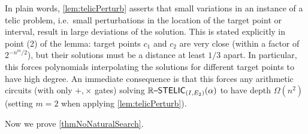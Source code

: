 \documentclass{amsart}
\theoremstyle{theorem}
\theoremstyle{remark}
\newcommand{\ccRSTELIC}{\mathbb{R}\textsf{\upshape --STELIC}}
\begin{document}
In plain words, \cref{lem:telicPerturb} asserts that small variations in an instance of a telic problem, i.e.\ small perturbations in the location of the target point or interval, result in large deviations of the solution. This is stated explicitly in point (2) of the lemma: target points $c_1$ and $c_2$ are very close (within a factor of $2^{-n^m/2}$), but their solutions must be a distance at least $1/3$ apart.
In particular, this forces polynomials interpolating the solutions for different target points to have high degree.
An immediate consequence is that this forces any arithmetic circuits (with only $+,\times$ gates) solving $\ccRSTELIC_{(I, E_2)}(\alpha)$ to have depth $\Omega(n^2)$ (setting $m=2$ when applying \cref{lem:telicPerturb}).

Now we prove \cref{thmNoNaturalSearch}.
\end{document}
